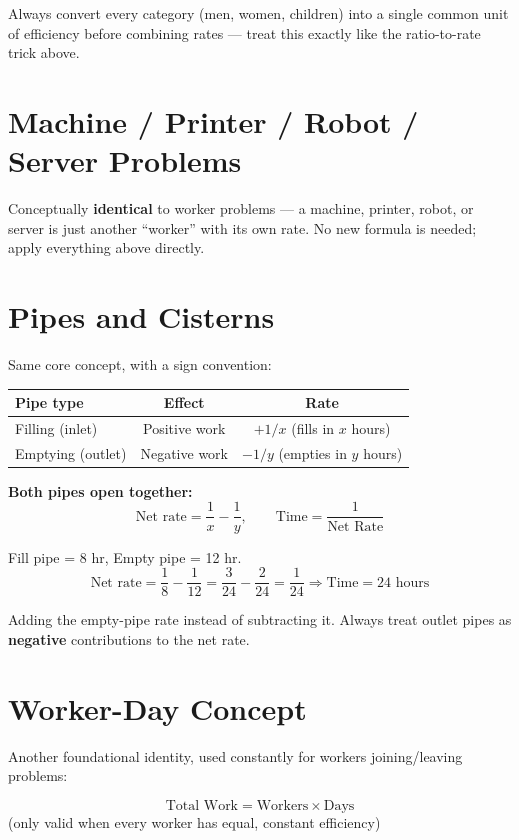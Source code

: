 \documentclass[11pt]{article}
\begin{document}
Always convert every category (men, women, children) into a single common unit of efficiency before
combining rates --- treat this exactly like the ratio-to-rate trick above.

\section{Machine / Printer / Robot / Server Problems}
Conceptually \textbf{identical} to worker problems --- a machine, printer, robot, or server is just
another ``worker'' with its own rate. No new formula is needed; apply everything above directly.

\section{Pipes and Cisterns}
Same core concept, with a sign convention:
\begin{formulabox}
\centering
\begin{tabular}{lcc}
\toprule
\textbf{Pipe type} & \textbf{Effect} & \textbf{Rate} \\
\midrule
Filling (inlet) & Positive work & $+1/x$ (fills in $x$ hours) \\
Emptying (outlet) & Negative work & $-1/y$ (empties in $y$ hours) \\
\bottomrule
\end{tabular}
\end{formulabox}

\textbf{Both pipes open together:}
\[
\text{Net rate} = \frac{1}{x} - \frac{1}{y}, \qquad \text{Time} = \frac{1}{\text{Net Rate}}
\]

\begin{examplebox}
Fill pipe = 8 hr, Empty pipe = 12 hr.
\[
\text{Net rate} = \frac{1}{8} - \frac{1}{12} = \frac{3}{24} - \frac{2}{24} = \frac{1}{24}
\Rightarrow \text{Time} = 24 \text{ hours}
\]
\end{examplebox}

\begin{warnbox}
Adding the empty-pipe rate instead of subtracting it. Always treat outlet pipes as \textbf{negative}
contributions to the net rate.
\end{warnbox}

\section{Worker-Day Concept}
Another foundational identity, used constantly for workers joining/leaving problems:
\begin{formulabox}
\[
\text{Total Work} = \text{Workers} \times \text{Days}
\]
(only valid when every worker has equal, constant efficiency)
\end{formulabox}
\end{document}
